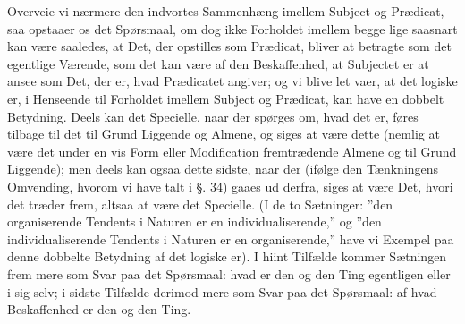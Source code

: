 \documentclass[12pt]{book}
\def\sperr#1{#1}%
\def\textit#1{#1}%
\def\emph#1{#1}%
\newcommand{\sperr}[1]{\textls[180]{#1}}
\newcommand{\opage}[1]{\marginnote{\footnotesize\textit{[#1]}}}
\begin{document}
Overveie vi nærmere den indvortes Sammenhæng imellem Subject og Prædicat, saa opstaaer os
det Spørsmaal, om dog ikke Forholdet imellem begge lige saasnart kan være saaledes, at
Det, der opstilles som Prædicat, bliver at betragte som det egentlige Værende, som det kan
være af den Beskaffenhed, at Subjectet er at ansee som Det, der er, hvad Prædicatet
angiver; og vi blive let vaer, at det logiske \sperr{er}, i Henseende til Forholdet imellem
Subject og Prædicat, kan have en dobbelt Betydning. Deels kan det Specielle, naar der
spørges om, hvad det er, føres tilbage til det til Grund Liggende og Almene, og siges at
være dette (nemlig at være det under en vis Form eller Modification fremtrædende Almene og
til Grund Liggende); men deels kan ogsaa dette sidste, naar der (ifølge den Tænkningens
Omvending, hvorom vi have talt i §. 34) gaaes ud derfra, siges at være Det, hvori det
træder frem, altsaa at være det Specielle. (I de to Sætninger: ''den organiserende Tendents
i Naturen er en individualiserende,'' og ''den individualiserende Tendents i Naturen er en
organiserende,'' have vi
\opage{264} Exempel paa denne dobbelte Betydning af det logiske er). I hiint Tilfælde kommer Sætningen
frem mere som Svar paa det Spørsmaal: hvad er den og den Ting egentligen eller i sig selv;
i sidste Tilfælde derimod mere som Svar paa det Spørsmaal: af hvad Beskaffenhed er den og
den Ting.
\end{document}

